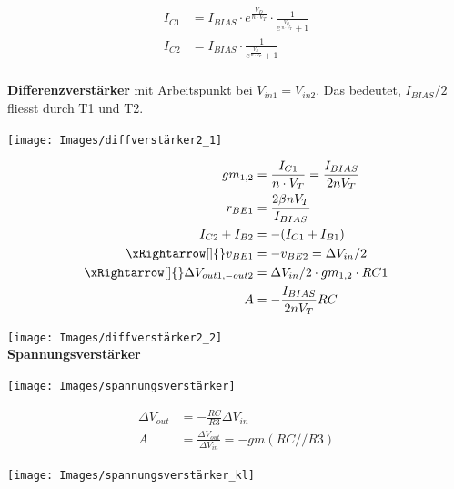 \begin{minipage}{0.30\textwidth}
	\begin{align*}
		I_{C1} &= I_{BIAS} \cdot e^{\frac{V_D}{n\cdot V_T}} \cdot \frac{1}{e^{\frac{V_D}{n\cdot V_T}} + 1} \\
		I_{C2} &= I_{BIAS} \cdot \frac{1}{e^{\frac{V_D}{n\cdot V_T}} + 1} \\
	\end{align*}
\end{minipage}
\textbf{Differenzverstärker} mit Arbeitspunkt bei $V_{in1} = V_{in2}$. Das bedeutet, $I_{BIAS}/2$ fliesst durch T1 und T2.\\
\begin{minipage}{0.20\textwidth}
	\noindent\texttt{[image: Images/diffverstärker2\_1]}
\end{minipage}%
\begin{minipage}{0.30\textwidth}
	\begin{align*}
		gm_{1,2} &= \frac{I_{C1}}{n\cdot V_T} = \frac{I_{BIAS}}{2nV_T} \\
        r_{BE1} &= \frac{2\beta n V_T}{I_{BIAS}} \\
        I_{C2} + I_{B2} &= - (I_{C1} + I_{B1}) \\
        \xRightarrow[]{} v_{BE1} &= -v_{BE2} = \Delta V_{in} / 2 \\
       \xRightarrow[]{} \Delta V_{out1,-out2} &= \Delta V_{in} / 2 \cdot gm_{1,2} \cdot RC1 \\
       A &= -\frac{I_{BIAS}}{2nV_T}RC
	\end{align*}
\end{minipage}
\noindent\texttt{[image: Images/diffverstärker2\_2]}\\

\textbf{Spannungsverstärker}\\
\begin{minipage}{0.20\textwidth}
	\texttt{[image: Images/spannungsverstärker]}\\
\end{minipage}%
\begin{minipage}{0.30\textwidth}
	\begin{align*}
		\Delta V_{out} &= - \frac{RC}{R3}\Delta V_{in} \\
		A &= \frac{\Delta V_{out}}{\Delta V_{in}} = -gm(RC//R3)
	\end{align*}
\end{minipage}
\texttt{[image: Images/spannungsverstärker\_kl]}



